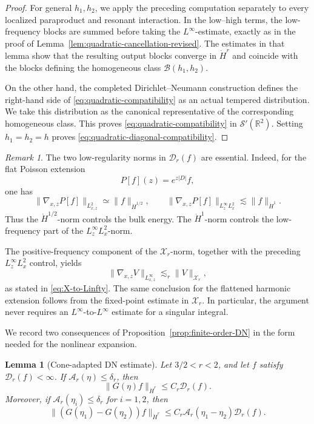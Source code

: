 \documentclass[12pt]{amsart}
\newtheorem{lemma}[theorem]{Lemma}
\theoremstyle{remark}
\newtheorem{remark}{Remark}[section]
\theoremstyle{definition}
\numberwithin{equation}{section}
\newcommand{\R}{\mathbb{R}}
\begin{document}
\begin{proof}
For general \(h_1,h_2\), we apply the preceding computation separately to every localized paraproduct and resonant interaction. 
In the low--high terms, the low-frequency blocks are summed before taking the \(L^\infty\)-estimate, exactly as in the proof of Lemma~\ref{lem:quadratic-cancellation-revised}. 
The estimates in that lemma show that the resulting output blocks converge in \(\dot H^r\) and coincide with the blocks defining the homogeneous class \(\mathcal B(h_1,h_2)\).

On the other hand, the completed Dirichlet--Neumann construction defines the right-hand side of \eqref{eq:quadratic-compatibility} as an actual tempered distribution. 
We take this distribution as the canonical representative of the corresponding homogeneous class. 
This proves
\eqref{eq:quadratic-compatibility} in \(\mathcal S'(\R^2)\). 
Setting \(h_1=h_2=h\) proves \eqref{eq:quadratic-diagonal-compatibility}.
\end{proof}

\begin{remark}
\label{rem:why-low-anchors}
The two low-regularity norms in \(\mathcal D_r(f)\) are essential.
Indeed, for the flat Poisson extension
\[
 P[f](z)=e^{z|D|}f,
\]
one has
\[
 \|\nabla_{x,z}P[f]\|_{L^2_{x,z}} \simeq \|f\|_{\dot H^{1/2}}, \qquad \|\nabla_{x,z}P[f]\|_{L^\infty_zL^2_x} \lesssim \|f\|_{\dot H^1}.
\]
Thus the \(\dot H^{1/2}\)-norm controls the bulk energy.
The \(\dot H^1\)-norm controls the low-frequency part of the
\(L^\infty_zL^2_x\)-norm.

The positive-frequency component of the \(\mathcal X_r\)-norm, together with the preceding \(L^\infty_zL^2_x\) control, yields
\[
 \|\nabla_{x,z}V\|_{L^\infty_{x,z}} \lesssim_r \|V\|_{\mathcal X_r},
\]
as stated in \eqref{eq:X-to-Linfty}.
The same conclusion for the flattened harmonic extension follows from the fixed-point estimate in \(\mathcal X_r\).
In particular, the argument never requires an \(L^\infty\)-to-\(L^\infty\) estimate for a singular integral.
\end{remark}

We record two consequences of Proposition~\ref{prop:finite-order-DN} in
the form needed for the nonlinear expansion.
\begin{lemma}[Cone-adapted DN estimate]
\label{lem:DN-one-input-revised}
Let \(3/2<r<2\), and let \(f\) satisfy \(\mathcal D_r(f)<\infty\).
If \(\mathcal A_r(\eta)\leq\delta_r\), then
\begin{equation*}
 \|G(\eta)f\|_{\dot H^r} \leq C_r\mathcal D_r(f).
\end{equation*}
Moreover, if \(\mathcal A_r(\eta_i)\leq\delta_r\) for \(i=1,2\), then
\begin{equation*}
 \|(G(\eta_1)-G(\eta_2))f\|_{\dot H^r} \leq C_r \mathcal A_r(\eta_1-\eta_2) \mathcal D_r(f).
\end{equation*}
\end{lemma}
\end{document}
